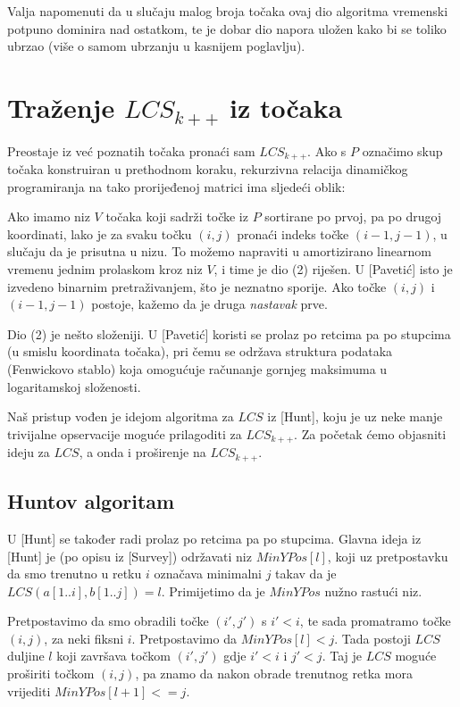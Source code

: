 \documentclass[times, utf8, seminar, numeric]{fer}
\begin{document}
Valja napomenuti da u slučaju malog broja točaka ovaj dio algoritma
vremenski potpuno dominira nad ostatkom, te je dobar dio napora uložen
kako bi se toliko ubrzao (više o samom ubrzanju u kasnijem poglavlju).

\section{Traženje $LCS_{k++}$ iz točaka}
Preostaje iz već poznatih točaka pronaći sam $LCS_{k++}$. Ako s $P$
označimo skup točaka konstruiran u prethodnom koraku, rekurzivna
relacija dinamičkog programiranja na tako prorijeđenoj matrici ima
sljedeći oblik:


Ako imamo niz $V$ točaka koji sadrži točke iz $P$ sortirane po prvoj,
pa po drugoj koordinati, lako je za svaku točku $(i, j)$ pronaći indeks
točke $(i-1, j-1)$, u slučaju da je prisutna u nizu. To možemo napraviti
u amortizirano linearnom vremenu jednim prolaskom kroz niz $V$, i time
je dio (2) riješen. U [Pavetić] isto je izvedeno binarnim pretraživanjem,
što je neznatno sporije. Ako točke $(i, j)$ i $(i-1, j-1)$ postoje,
kažemo da je druga \emph{nastavak} prve.

Dio (2) je nešto složeniji. U [Pavetić] koristi se prolaz po retcima
pa po stupcima (u smislu koordinata točaka), pri čemu se održava
struktura podataka (Fenwickovo stablo) koja omogućuje računanje gornjeg
maksimuma u logaritamskoj složenosti. 

Naš pristup vođen je idejom algoritma za $LCS$ iz [Hunt], koju je uz neke
manje trivijalne opservacije moguće prilagoditi za $LCS_{k++}$. Za početak
ćemo objasniti ideju za $LCS$, a onda i proširenje na $LCS_{k++}$.

\subsection{Huntov algoritam}
U [Hunt] se također radi prolaz po retcima pa po stupcima.  Glavna
ideja iz [Hunt] je (po opisu iz [Survey]) održavati niz
$MinYPos[l]$, koji uz pretpostavku da smo trenutno u retku $i$
označava minimalni $j$ takav da je $LCS(a[1..i], b[1..j]) =
l$. Primijetimo da je $MinYPos$ nužno rastući niz.

Pretpostavimo da smo obradili točke $(i', j')$ s $i' < i$, te sada
promatramo točke $(i, j)$, za neki fiksni $i$. Pretpostavimo da
$MinYPos[l] < j$.  Tada postoji $LCS$ duljine $l$ koji završava točkom
$(i', j')$ gdje $i' < i$ i $j' < j$. Taj je $LCS$ moguće proširiti točkom
$(i, j)$, pa znamo da nakon obrade trenutnog retka mora vrijediti
$MinYPos[l+1] <= j$.  
\end{document}
